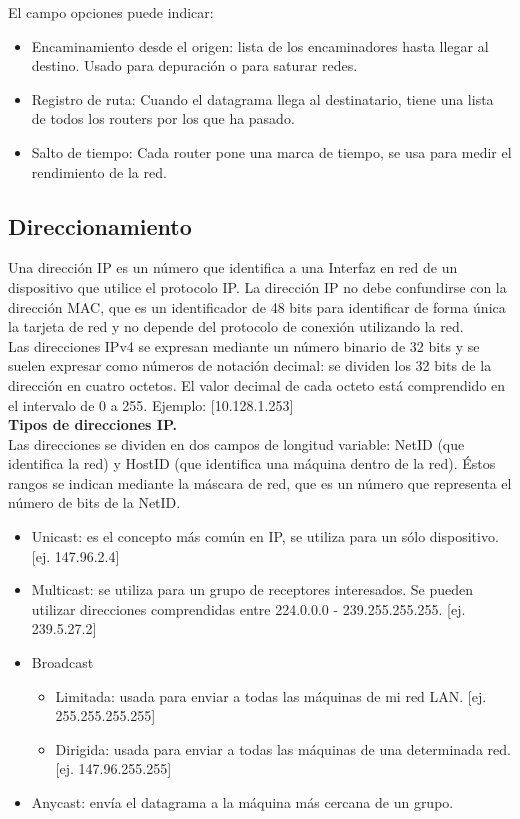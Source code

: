 El campo opciones puede indicar:
\begin{itemize}
\item Encaminamiento desde el origen: lista de los encaminadores hasta llegar al destino. Usado para depuración o para saturar redes.
\item Registro de ruta: Cuando el datagrama llega al destinatario, tiene una lista de todos los routers por los que ha pasado.
\item Salto de tiempo: Cada router pone una marca de tiempo, se usa para medir el rendimiento de la red.
\end{itemize}

\subsection{Direccionamiento}

Una dirección IP es un número que identifica a una Interfaz en red  de un dispositivo que utilice el protocolo IP. La dirección IP no debe confundirse con la dirección MAC, que es un identificador de 48 bits para identificar de forma única la tarjeta de red y no depende del protocolo de conexión utilizando la red.\\

Las direcciones IPv4 se expresan mediante un número binario de 32 bits y se suelen expresar como números de notación decimal: se dividen los 32 bits de la dirección en cuatro octetos. El valor decimal de cada octeto está comprendido en el intervalo de 0 a 255. Ejemplo: [10.128.1.253]\\

\textbf{Tipos de direcciones IP.}\\
Las direcciones se dividen en dos campos de longitud variable: NetID (que identifica la red) y HostID (que identifica una máquina dentro de la red). Éstos rangos se indican mediante la máscara de red, que es un número que representa el número de bits de la NetID.

\begin{itemize}
\item Unicast: es el concepto más común en IP, se utiliza para un sólo dispositivo. [ej. 147.96.2.4]
\item Multicast: se utiliza para un grupo de receptores interesados. Se pueden utilizar direcciones comprendidas entre 224.0.0.0 - 239.255.255.255. [ej. 239.5.27.2]
\item Broadcast
	\begin{itemize}
	\item Limitada: usada para enviar a todas las máquinas de mi red LAN. [ej. 255.255.255.255]
    \item Dirigida: usada para enviar a todas las máquinas de una determinada red. [ej. 147.96.255.255]
	\end{itemize}
\item Anycast: envía el datagrama a la máquina más cercana de un grupo.
\end{itemize}

